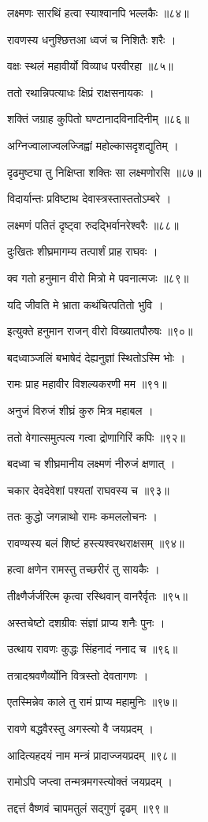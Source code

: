 लक्ष्मणः सारथिं हत्वा स्याश्वानपि भल्लकैः ॥८४॥

रावणस्य धनुश्छित्तआ ध्वजं च निशितैः शरैः ।

वक्षः स्थलं महावीर्यो विव्याध परवीरहा ॥८५॥

ततो रथान्निपत्याधः क्षिप्रं राक्षसनायकः ।

शक्तिं जग्राह कुपितो घण्टानादविनादिनीम् ॥८६॥

अग्निज्वालाज्वलज्जिह्वां महोल्कासदृशद्युतिम् ।

दृढमुष्ट्या तु निक्षिप्ता शक्तिः सा लक्ष्मणोरसि ॥८७॥

विदार्यान्तः प्रविष्टाथ देवास्त्रस्तास्ततोऽम्बरे ।

लक्ष्मणं पतितं दृष्ट्वा रुदद्भिर्वानरेश्वरैः ॥८८॥

दुःखितः शीघ्रमागम्य तत्पार्शं प्राह राघवः ।

क्व गतो हनुमान वीरो मित्रो मे पवनात्मजः ॥८९॥

यदि जीवति मे भ्राता कथंचित्पतितो भुवि ।

इत्युक्ते हनुमान राजन् वीरो विख्यातपौरुषः ॥९०॥

बदध्वाञ्जलिं बभाषेदं देह्यनुज्ञां स्थितोऽस्मि भोः ।

रामः प्राह महावीर विशल्यकरणी मम ॥९१॥

अनुजं विरुजं शीघ्रं कुरु मित्र महाबल ।

ततो वेगात्समुत्पत्य गत्वा द्रोणागिरिं कपिः ॥९२॥

बदध्वा च शीघ्रमानीय लक्ष्मणं नीरुजं क्षणात् ।

चकार देवदेवेशां पश्यतां राघवस्य च ॥९३॥

ततः कुद्धो जगन्नाथो रामः कमललोचनः ।

रावण्यस्य बलं शिष्टं हस्त्यश्वरथराक्षसम् ॥९४॥

हत्वा क्षणेन रामस्तु तच्छरीरं तु सायकैः ।

तीक्ष्णैर्जर्जरित्म कृत्वा रस्थिवान् वानरैर्वृतः ॥९५॥

अस्तचेष्टो दशग्रीवः संज्ञां प्राप्य शनैः पुनः ।

उत्थाय रावणः कुद्धः सिंहनादं ननाद च ॥९६॥

तत्रादश्रवणैर्व्योनि वित्रस्तो देवतागणः ।

एतस्मिन्नेव काले तु रामं प्राप्य महामुनिः ॥९७॥

रावणे बद्धवैरस्तु अगस्त्यो वै जयप्रदम् ।

आदित्यहदयं नाम मन्त्रं प्रादाज्जयप्रदम् ॥९८॥

रामोऽपि जप्त्वा तन्मत्रमगस्त्योक्तं जयप्रदम् ।

तद्दत्तं वैष्णवं चापमतुलं सद्गुणं दृढम् ॥९९॥

